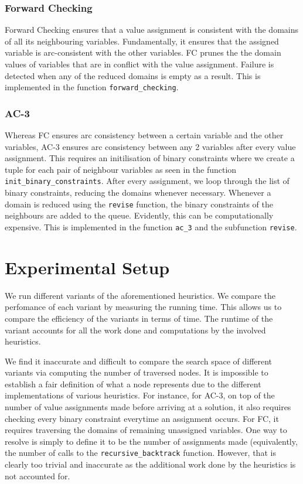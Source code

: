 \documentclass[runningheads]{llncs}
\begin{document}
\subsubsection{Forward Checking}

Forward Checking ensures that a value assignment is consistent with the domains of all its neighbouring variables. Fundamentally, it ensures that the assigned variable is arc-consistent with the other variables. FC prunes the the domain values of variables that are in conflict with the value assignment. Failure is detected when any of the reduced domains is empty as a result. This is implemented in the function \verb`forward_checking`.

\subsubsection{AC-3}

Whereas FC ensures arc consistency between a certain variable and the other variables, AC-3 ensures arc consistency between any 2 variables after every value assignment. This requires an initilisation of binary constraints where we create a tuple for each pair of neighbour variables as seen in the function \verb`init_binary_constraints`. After every assignment, we loop through the list of binary constraints, reducing the domains whenever necessary. Whenever a domain is reduced using the \verb`revise` function, the binary constraints of the neighbours are added to the queue. Evidently, this can be computationally expensive. This is implemented in the function  \verb`ac_3` and the subfunction \verb`revise`. 

\section{Experimental Setup}

We run different variants of the aforementioned heuristics. We compare the perfomance of each variant by measuring the running time. This allows us to compare the efficiency of the variants in terms of time. The runtime of the variant accounts for all the work done and computations by the involved heuristics.

We find it inaccurate and difficult to compare the search space of different variants via computing the number of traversed nodes. It is impossible to establish a fair definition of what a node represents due to the different implementations of various heuristics. For instance, for AC-3, on top of the number of value assignments made before arriving at a solution, it also requires checking every binary constraint everytime an assignment occurs. For FC,  it requires traversing the domains of remaining unassigned variables. One way to resolve is simply to define it to be the number of assignments made (equivalently, the number of calls to the \verb`recursive_backtrack` function. However, that is clearly too trivial and inaccurate as the additional work done by the heuristics is not accounted for. 
\end{document}
